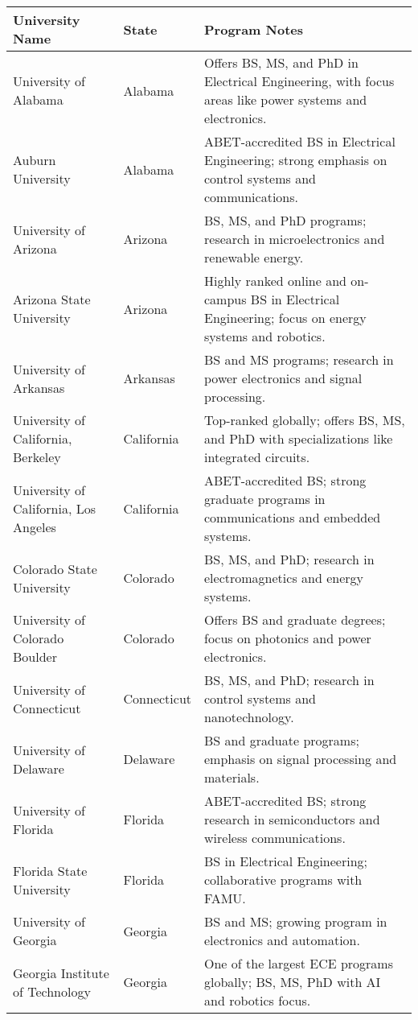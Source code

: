 \documentclass[12pt]{article}
\begin{document}
\begin{longtable}{p{} p{} p{}}
\toprule
\textbf{University Name} & \textbf{State} & \textbf{Program Notes} \\
\midrule
\endhead
University of Alabama & Alabama & Offers BS, MS, and PhD in Electrical Engineering, with focus areas like power systems and electronics. \\
Auburn University & Alabama & ABET-accredited BS in Electrical Engineering; strong emphasis on control systems and communications. \\
University of Arizona & Arizona & BS, MS, and PhD programs; research in microelectronics and renewable energy. \\
Arizona State University & Arizona & Highly ranked online and on-campus BS in Electrical Engineering; focus on energy systems and robotics. \\
University of Arkansas & Arkansas & BS and MS programs; research in power electronics and signal processing. \\
University of California, Berkeley & California & Top-ranked globally; offers BS, MS, and PhD with specializations like integrated circuits. \\
University of California, Los Angeles & California & ABET-accredited BS; strong graduate programs in communications and embedded systems. \\
Colorado State University & Colorado & BS, MS, and PhD; research in electromagnetics and energy systems. \\
University of Colorado Boulder & Colorado & Offers BS and graduate degrees; focus on photonics and power electronics. \\
University of Connecticut & Connecticut & BS, MS, and PhD; research in control systems and nanotechnology. \\
University of Delaware & Delaware & BS and graduate programs; emphasis on signal processing and materials. \\
University of Florida & Florida & ABET-accredited BS; strong research in semiconductors and wireless communications. \\
Florida State University & Florida & BS in Electrical Engineering; collaborative programs with FAMU. \\
University of Georgia & Georgia & BS and MS; growing program in electronics and automation. \\
Georgia Institute of Technology & Georgia & One of the largest ECE programs globally; BS, MS, PhD with AI and robotics focus. \\

\end{longtable}
\end{document}
